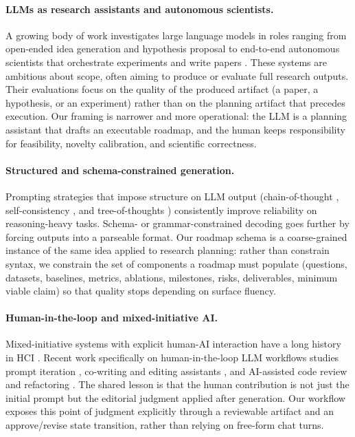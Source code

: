 \documentclass{article}
\begin{document}
\paragraph{LLMs as research assistants and autonomous scientists.}
A growing body of work investigates large language models in roles
ranging from open-ended idea generation and hypothesis proposal to
end-to-end autonomous scientists that orchestrate experiments and
write papers \cite{lu2024aiscientist, baek2024researchagent, yang2023largelanguagemodelshypotheses}. These systems are ambitious
about scope, often aiming to produce or evaluate full research outputs.
Their evaluations focus on the quality of the produced artifact (a
paper, a hypothesis, or an experiment) rather than on the planning
artifact that precedes execution. Our framing is narrower and more
operational: the LLM is a planning assistant that drafts an executable
roadmap, and the human keeps responsibility for feasibility, novelty
calibration, and scientific correctness.

\paragraph{Structured and schema-constrained generation.}
Prompting strategies that impose structure on LLM output (chain-of-thought
\cite{wei2022chainofthought},
self-consistency \cite{wang2023selfconsistency}, and tree-of-thoughts
\cite{yao2024treeofthoughts}) consistently improve reliability on
reasoning-heavy tasks. Schema- or grammar-constrained decoding
\cite{willard2023grammarconstrained, geng2024constraineddecoding}
goes further by forcing outputs into a parseable format. Our roadmap
schema is a coarse-grained instance of the same idea applied to research
planning: rather than constrain syntax, we constrain the set of
components a roadmap must populate (questions, datasets, baselines,
metrics, ablations, milestones, risks, deliverables, minimum viable
claim) so that quality stops depending on surface fluency.

\paragraph{Human-in-the-loop and mixed-initiative AI.}
Mixed-initiative systems with explicit human-AI interaction have a long
history in HCI \cite{horvitz1999mixedinitiative, amershi2019humanaiinteraction}. Recent work specifically on
human-in-the-loop LLM workflows studies prompt iteration
\cite{zamfirescupereira2023nonexperts},
co-writing and editing assistants \cite{lee2022coauthor, yuan2022wordcraft}, and AI-assisted code review and refactoring
\cite{mozannar2024readingbetween}. The shared lesson is that the human
contribution is not just the initial prompt but the editorial judgment
applied after generation. Our workflow exposes this point of judgment
explicitly through a reviewable artifact and an approve/revise state
transition, rather than relying on free-form chat turns.
\end{document}
